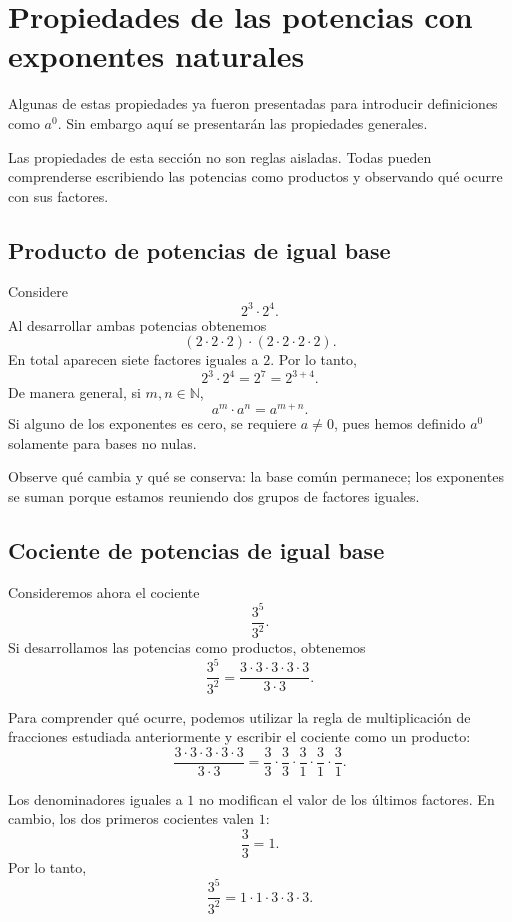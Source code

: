 \section[Propiedades de potencias naturales]{Propiedades de las potencias con exponentes naturales}

Algunas de estas propiedades ya fueron presentadas para introducir definiciones como \(a^0\). Sin embargo aquí se presentarán las propiedades generales.

Las propiedades de esta sección no son reglas aisladas. Todas pueden comprenderse escribiendo las potencias como productos y observando qué ocurre con sus factores.

\subsection{Producto de potencias de igual base}

Considere
\[
2^3\cdot2^4.
\]
Al desarrollar ambas potencias obtenemos
\[
(2\cdot2\cdot2)\cdot(2\cdot2\cdot2\cdot2).
\]
En total aparecen siete factores iguales a \(2\). Por lo tanto,
\[
2^3\cdot2^4=2^7=2^{3+4}.
\]
De manera general, si \(m,n\in\mathbb N\),
\[
a^m\cdot a^n=a^{m+n}.
\]
Si alguno de los exponentes es cero, se requiere \(a\ne0\), pues hemos definido \(a^0\) solamente para bases no nulas.

Observe qué cambia y qué se conserva: la base común permanece; los exponentes se suman porque estamos reuniendo dos grupos de factores iguales.

\subsection{Cociente de potencias de igual base}

Consideremos ahora el cociente
\[
\frac{3^5}{3^2}.
\]
Si desarrollamos las potencias como productos, obtenemos
\[
\frac{3^5}{3^2}
=
\frac{3\cdot3\cdot3\cdot3\cdot3}{3\cdot3}.
\]

Para comprender qué ocurre, podemos utilizar la regla de multiplicación de fracciones estudiada anteriormente y escribir el cociente como un producto:
\[
\frac{3\cdot3\cdot3\cdot3\cdot3}{3\cdot3}
=
\frac33\cdot
\frac33\cdot
\frac31\cdot
\frac31\cdot
\frac31.
\]

Los denominadores iguales a \(1\) no modifican el valor de los últimos factores. En cambio, los dos primeros cocientes valen \(1\):
\[
\frac33=1.
\]
Por lo tanto,
\[
\frac{3^5}{3^2}
=
1\cdot1\cdot3\cdot3\cdot3.
\]

